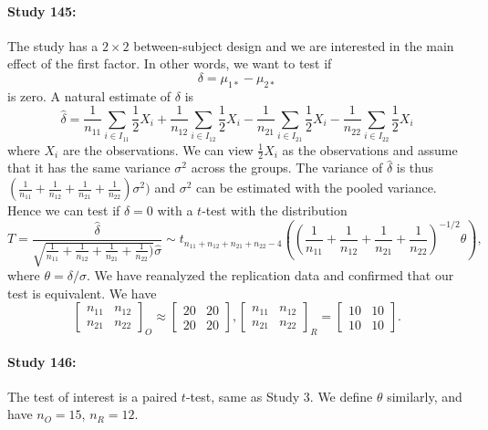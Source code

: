 \documentclass[11pt]{article}
\theoremstyle{definition}
\theoremstyle{custom}
\newcommand{\hdelta}{\hat{\delta}}
\newcommand{\hsigma}{\hat{\sigma}}
\begin{document}
  \paragraph{Study 145: \citet{Halevy:2008gb}}
  The study has a $2 \times 2$ between-subject design and we are interested in the main effect of the first factor. In other words, we want to test if
  \[
  \delta = \mu_{1*} - \mu_{2*}
  \]
  is zero. A natural estimate of $\delta$ is
  \[
  \hdelta = \frac{1}{n_{11}} \sum_{i \in I_{11}} \frac{1}{2} X_i + \frac{1}{n_{12}} \sum_{i \in I_{12}} \frac{1}{2} X_i - \frac{1}{n_{21}} \sum_{i \in I_{21}} \frac{1}{2} X_i - \frac{1}{n_{22}} \sum_{i \in I_{22}} \frac{1}{2} X_i
  \]
  where $X_i$ are the observations. We can view $\frac{1}{2} X_i$ as the observations and assume that it has the same variance $\sigma^2$ across the groups. The variance of $\hdelta$ is thus $(\frac{1}{n_{11}} + \frac{1}{n_{12}} + \frac{1}{n_{21}} + \frac{1}{n_{22}}) \sigma^2)$ and $\sigma^2$ can be estimated with the pooled variance. Hence we can test if $\delta = 0$ with a $t$-test with the distribution
  \[
  T = \frac{\hdelta}{\sqrt{\frac{1}{n_{11}} + \frac{1}{n_{12}} + \frac{1}{n_{21}} + \frac{1}{n_{22}})} \hsigma} \sim t_{n_{11} + n_{12} + n_{21} + n_{22} - 4} \left(\left(\frac{1}{n_{11}} + \frac{1}{n_{12}} + \frac{1}{n_{21}} + \frac{1}{n_{22}}\right)^{-1/2} \theta\right),
  \]
  where $\theta = \delta / \sigma$. We have reanalyzed the replication data and confirmed that our test is equivalent. We have
  \[
  \begin{bmatrix}
  n_{11} & n_{12} \\
  n_{21} & n_{22}
  \end{bmatrix}_O \approx \begin{bmatrix}
  20 & 20 \\
  20 & 20
  \end{bmatrix}, \begin{bmatrix}
  n_{11} & n_{12} \\
  n_{21} & n_{22}
  \end{bmatrix}_R = \begin{bmatrix}
  10 & 10 \\
  10 & 10
  \end{bmatrix}.
  \]

  \paragraph{Study 146: \citet{Janssen:2008ca}}
  The test of interest is a paired $t$-test, same as Study 3. We define $\theta$ similarly, and have $n_O = 15$, $n_R = 12$.
\end{document}
